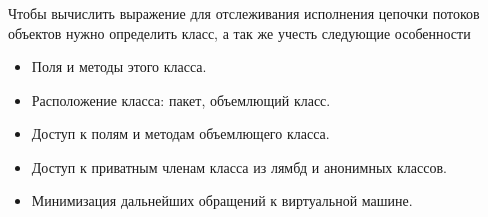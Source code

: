\begin{frame}[noframenumbering]
\frametitle{\insertsection} 
\framesubtitle{\insertsubsection}
Чтобы вычислить выражение для отслеживания исполнения цепочки потоков объектов нужно определить класс, а так же учесть следующие особенности
\begin{itemize}
	\item Поля и методы этого класса.
	
	\item Расположение класса: пакет, объемлющий класс.
	
	\item Доступ к полям и методам объемлющего класса.

	\item Доступ к приватным членам класса из лямбд и анонимных классов.

	\item Минимизация дальнейших обращений к виртуальной машине.
\end{itemize}

\inputminted{java}{code/EvalClass.java}
\end{frame}
